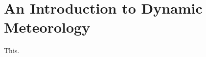 \chapter{An Introduction to Dynamic Meteorology}
\label{ch:houlton}

This\citep{holton_introduction_2012}.